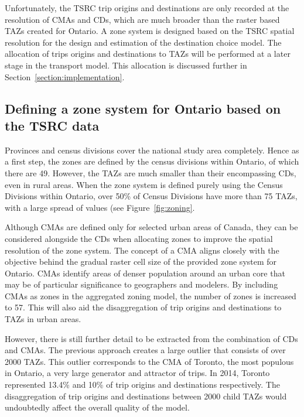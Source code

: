 
Unfortunately, the TSRC trip origins and destinations are only recorded at the resolution of CMAs and CDs, which are much broader than the raster based TAZs created for Ontario. A zone system is designed based on the TSRC spatial resolution for the design and estimation of the destination choice model. The allocation of trips origins and destinations to TAZs will be performed at a later stage in the transport model. This allocation is discussed further in Section~\ref{section:implementation}.


\subsection{Defining a zone system for Ontario based on the TSRC data}
\label{section:zoning}
Provinces and census divisions cover the national study area completely. Hence as a first step, the zones are defined by the census divisions within Ontario, of which there are 49. However, the TAZs are much smaller than their encompassing CDs, even in rural areas. When the zone system is defined purely using the Census Divisions within Ontario, over 50\% of Census Divisions have more than 75 TAZs, with a large spread of values (see Figure~\ref{fig:zoning}. 

Although CMAs are defined only for selected urban areas of Canada, they can be considered alongside the CDs when allocating zones to improve the spatial resolution of the zone system. The concept of a CMA aligns closely with the objective behind the gradual raster cell size of the provided zone system for Ontario. CMAs identify areas of denser population around an urban core that may be of particular significance to geographers and modelers. By including CMAs as zones in the aggregated zoning model, the number of zones is increased to 57. This will also aid the disaggregation of trip origins and destinations to TAZs in urban areas. 

However, there is still further detail to be extracted from the combination of CDs and CMAs. The previous approach creates a large outlier that consists of over 2000 TAZs. This outlier corresponds to the CMA of Toronto, the most populous in Ontario, a very large generator and attractor of trips. In 2014, Toronto represented 13.4\% and 10\% of trip origins and destinations respectively. The disaggregation of trip origins and destinations between 2000 child TAZs would undoubtedly affect the overall quality of the model. 


